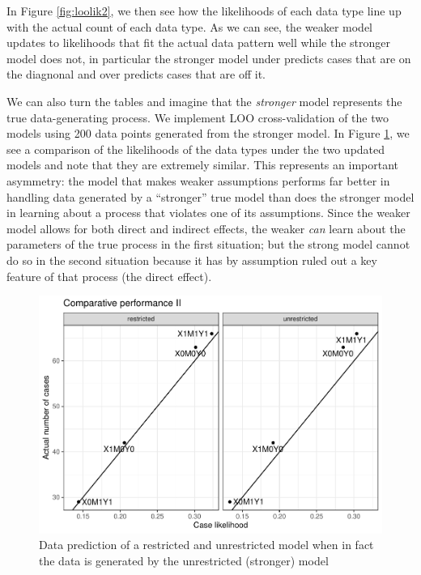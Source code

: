 \documentclass[
  12pt,
]{book}
\begin{document}
In Figure \ref{fig:loolik2}, we then see how the likelihoods of each data type line up with the actual count of each data type. As we can see, the weaker model updates to likelihoods that fit the actual data pattern well while the stronger model does not, in particular the stronger model under predicts cases that are on the diagnonal and over predicts cases that are off it.

We can also turn the tables and imagine that the \emph{stronger} model represents the true data-generating process. We implement LOO cross-validation of the two models using 200 data points generated from the stronger model. In Figure \ref{fig:loostronger}, we see a comparison of the likelihoods of the data types under the two updated models and note that they are extremely similar. This represents an important asymmetry: the model that makes weaker assumptions performs far better in handling data generated by a ``stronger'' true model than does the stronger model in learning about a process that violates one of its assumptions. Since the weaker model allows for both direct and indirect effects, the weaker \emph{can} learn about the parameters of the true process in the first situation; but the strong model cannot do so in the second situation because it has by assumption ruled out a key feature of that process (the direct effect).

\begin{figure}
\centering
\includegraphics{ii_files/figure-latex/loostronger-1.pdf}
\caption{\label{fig:loostronger}Data prediction of a restricted and unrestricted model when in fact the data is generated by the unrestricted (stronger) model}
\end{figure}
\end{document}
